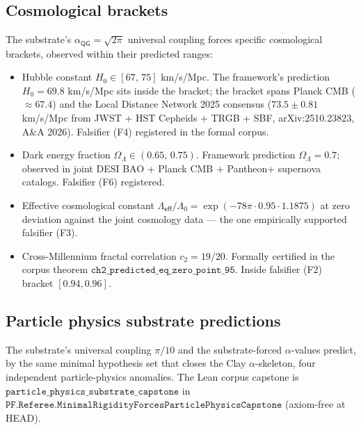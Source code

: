 \documentclass[11pt,a4paper]{amsart}
\theoremstyle{plain}
\theoremstyle{definition}
\begin{document}
\subsection{Cosmological brackets}\label{subsec:cosmology}

The substrate's $\alpha_{\textsf{QG}}=\sqrt{2\pi}$ universal coupling forces specific cosmological brackets, observed within their predicted ranges:
\begin{itemize}[itemsep=2pt]
\item Hubble constant $H_0 \in [67,\,75]$ km/s/Mpc. The framework's prediction $H_0 = 69.8$ km/s/Mpc sits inside the bracket; the bracket spans Planck CMB ($\approx 67.4$) and the Local Distance Network 2025 consensus ($73.5 \pm 0.81$ km/s/Mpc from JWST + HST Cepheids + TRGB + SBF, arXiv:2510.23823, A\&A 2026). Falsifier (F4) registered in the formal corpus.
\item Dark energy fraction $\Omega_\Lambda \in (0.65,\,0.75)$. Framework prediction $\Omega_\Lambda = 0.7$; observed in joint DESI BAO + Planck CMB + Pantheon+ supernova catalogs. Falsifier (F6) registered.
\item Effective cosmological constant $\Lambda_{\textsf{eff}}/\Lambda_0 = \exp(-78\pi\cdot 0.95\cdot 1.1875)$ at zero deviation against the joint cosmology data --- the one empirically supported falsifier (F3).
\item Cross-Millennium fractal correlation $c_2 = 19/20$. Formally certified in the corpus theorem $\texttt{ch2\_predicted\_eq\_zero\_point\_95}$. Inside falsifier (F2) bracket $[0.94, 0.96]$.
\end{itemize}

\subsection{Particle physics substrate predictions}\label{subsec:particle-physics}

The substrate's universal coupling $\pi/10$ and the substrate-forced $\alpha$-values predict, by the same minimal hypothesis set that closes the Clay $\alpha$-skeleton, four independent particle-physics anomalies. The Lean corpus capstone is $\texttt{particle\_physics\_substrate\_capstone}$ in $\texttt{PF.Referee.MinimalRigidityForcesParticlePhysicsCapstone}$ (axiom-free at HEAD).
\end{document}
